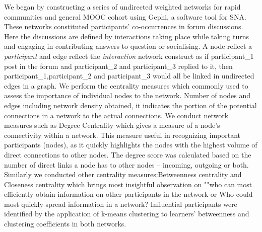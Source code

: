 \documentclass[manuscript,screen,review]{acmart}
\begin{document}
We began by constructing a series of undirected weighted networks for rapid communities and general MOOC cohort using Gephi, a software tool for SNA. These networks constituted participants’ co-occurrences in forum discussions. Here the discussions are defined by interactions taking place  while taking turns and engaging in contributing answers to question or socialising. A node reflect a \textit{participant} and edge reflect the \textit{interaction} network construct as if participant\_1 post in the forum and participant\_2 and participant\_3 replied to it, then participant\_1,participant\_2 and participant\_3 would all be linked in undirected edges in a graph. We perform the centrality measures which commonly used to assess the importance of individual nodes to the network. Number of nodes and edges including network density obtained, it indicates the portion of the potential connections in a network to the actual connections. We conduct network measures such as Degree Centrality which gives a measure of a node’s connectivity within a network. This measure useful in recognizing important participants (nodes), as it quickly highlights the nodes with the highest volume of direct connections to other nodes. The degree score was calculated based on the number of direct links a node has to other nodes – incoming, outgoing or both. Similarly we conducted other centrality measures:Betweenness centrality and Closeness centrality which brings most insightful observation on ""who can most efficiently obtain information on other participants in the network or Who could most quickly spread information in a network? Influential participants were identified by the application of k-means clustering to learners’ betweenness and clustering coefficients in both networks.  


 
\end{document}
